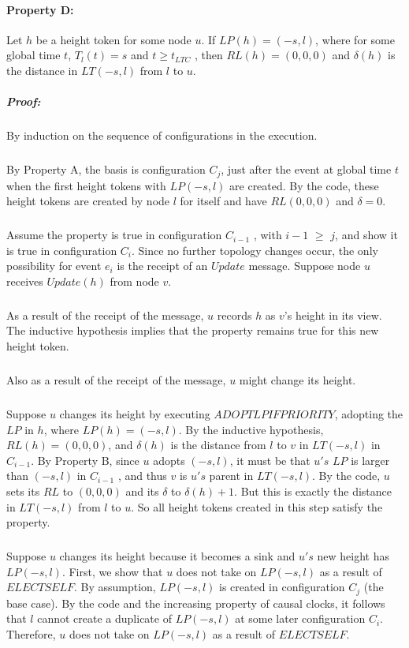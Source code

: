 \paragraph{Property D:}Let $h$ be a height token for some node $u$. If $LP(h) = (-s, l)$, where for some global time $t$, $T_l (t) = s$ and $t \geq t_{LTC}$ , then $RL(h) = (0, 0, 0)$ and $\delta (h)$ is the distance in $LT (-s, l)$ from $l$ to $u$.
\subparagraph{Proof:}By induction on the sequence of configurations in the execution.
\subparagraph{}By Property A, the basis is configuration $C_j$, just after the event at global time $t$ when the first height tokens with $LP (-s, l)$ are created. By the code, these height tokens are created by node $l$ for itself and have $RL (0, 0, 0)$ and $\delta = 0$.
\subparagraph{}Assume the property is true in configuration $C_{i-1}$ , with $i-1$ $\geq$ $j$, and show it is true in configuration $C_i$. Since no further topology changes occur, the only possibility for event $e_i$ is the receipt of an $Update$ message. Suppose node $u$ receives $Update(h)$ from node $v$.
\subparagraph{}As a result of the receipt of the message, $u$ records $h$ as $v$'s height in its view. The inductive hypothesis implies that the property remains true for this new height token.
\subparagraph{}Also as a result of the receipt of the message, $u$ might change its height.
\subparagraph{}Suppose $u$ changes its height by executing $ADOPTLPIFPRIORITY$, adopting the $LP$ in $h$, where $LP(h) = (-s, l)$. By the inductive hypothesis, $RL(h) = (0, 0, 0)$, and $\delta (h)$ is the distance from $l$ to $v$ in $LT (-s, l)$ in $C_{i-1}$. By Property B, since $u$ adopts $(-s, l)$, it must be that $u's$ $LP$ is larger than $(-s, l)$ in $C_{i-1}$ , and thus $v$ is $u's$ parent in $LT (-s, l)$. By the code, $u$ sets its $RL$ to $(0, 0, 0)$ and its $\delta$ to $\delta (h) + 1$. But this is exactly the distance in $LT (-s, l)$ from $l$ to $u$. So all height tokens created in this step satisfy the property.
\subparagraph{}Suppose $u$ changes its height because it becomes a sink and $u's$ new height has $LP (-s, l)$. First, we show that $u$ does not take on $LP (-s, l)$ as a result of $ELECTSELF$. By assumption, $LP (-s, l)$ is created in configuration $C_j$ (the base case). By the code and the increasing property of causal clocks, it follows that $l$ cannot create a duplicate of $LP (-s, l)$ at some later configuration $C_i$. Therefore, $u$ does not take on $LP (-s, l)$ as a result of $ELECTSELF$.
